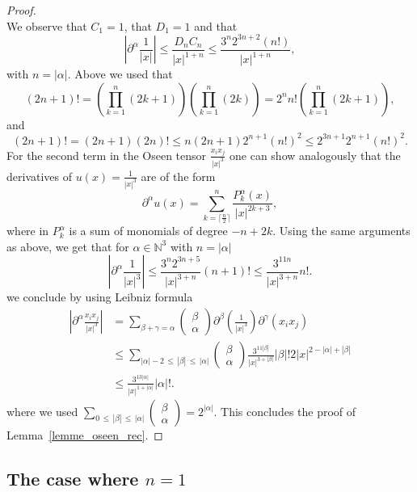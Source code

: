 \documentclass[AHL,Unicode,longabstracts,published]{cedram}
\newcommand{\N}{\mathbb{N}}
\renewcommand{\leq}{\leqslant}
\begin{document}
\begin{proof}
\[\]
We observe that $C_1=1$, that $D_1=1$ and that
\[
|\partial^\alpha \frac{1}{|x|} |\leq \frac{D_n C_n}{|x|^{1+n}} \leq \frac{3^{n} 2^{3n+2}(n!)} {|x|^{1+n}},
\]
with $n=|\alpha|$. Above we used that
\[
(2n+1)!=\left(\underset{k=1}{\overset{n}{\prod}} (2k+1)\right)\left(\underset{k=1}{\overset{n}{\prod}} (2k)\right)=2^n n! \left(\underset{k=1}{\overset{n}{\prod}} (2k+1)\right),
\]
and
\[
(2n+1)! = (2n+1) (2n)! \leq n(2n+1) 2^{n+1} (n!)^2 \leq 2^{3n+1} 2^{n+1} (n!)^2.
\]
For the second term in the Oseen tensor $\frac{x_ix_j}{|x|^3} $ one can show analogously that the derivatives of $u(x)=\frac{1}{|x|^3} $ are of the form
\[
\partial^\alpha u(x)= \underset{k=\lceil \frac{n}{2}\rceil}{\overset{n}{\sum}}\frac{P_k^\alpha(x)}{|x|^{2k+3}},
\]
where in $P_k^\alpha$ is a sum of monomials of degree $ -n+2k $. Using the same arguments as above, we get that for $\alpha \in \N^3$ with $n=|\alpha|$
\[
\left|\partial^\alpha \frac{1}{|x|^3}\right|\leq \frac{3^{n} 2^{3n+5} }{|x|^{3+n}} (n+1)! \leq \frac{3^{11n}}{|x|^{3+n}} n!.
\]
we conclude by using Leibniz formula
\begin{align*}
\left|\partial^\alpha \frac{x_i x_j}{|x|^3} \right|&= \underset{\beta+\gamma=\alpha}{\sum}
\begin{pmatrix} \beta \\ \alpha
\end{pmatrix} \partial^\beta \left(\frac{1}{|x|^3}\right) \partial^{\gamma} (x_ix_j) \\
&\leq \underset{|\alpha|-2\,\leq\,|\beta|\,\leq\,
|\alpha|}{\sum}
\begin{pmatrix} \beta \\ \alpha
\end{pmatrix} \frac{3^{11|\beta|}}{|x|^{3+|\beta|}}|\beta|! 2|x|^{2-|\alpha|+|\beta|}\\
&\leq \frac{3^{13|\alpha|}}{|x|^{1+|\alpha|}}|\alpha|!.
\end{align*}
where we used $ {\sum}_{0\,\leq\,|\beta|\,\leq\,
|\alpha|}
(\begin{smallmatrix}
\beta \\ \alpha
\end{smallmatrix})=2^{|\alpha|} $.
This concludes the proof of Lemma~\ref{lemme_oseen_rec}.
\end{proof}



\subsection{The case where \texorpdfstring{$n=1$}{n=1}}
\end{document}
